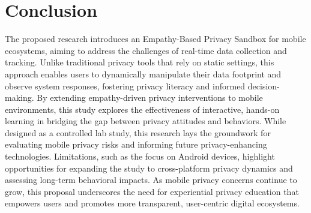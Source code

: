 \documentclass[acmlarge, nonacm]{acmart}
\begin{document}





\section{Conclusion}

The proposed research introduces an Empathy-Based Privacy Sandbox for mobile ecosystems, aiming to address the challenges of real-time data collection and tracking. Unlike traditional privacy tools that rely on static settings, this approach enables users to dynamically manipulate their data footprint and observe system responses, fostering privacy literacy and informed decision-making. By extending empathy-driven privacy interventions to mobile environments, this study explores the effectiveness of interactive, hands-on learning in bridging the gap between privacy attitudes and behaviors. While designed as a controlled lab study, this research lays the groundwork for evaluating mobile privacy risks and informing future privacy-enhancing technologies. Limitations, such as the focus on Android devices, highlight opportunities for expanding the study to cross-platform privacy dynamics and assessing long-term behavioral impacts. As mobile privacy concerns continue to grow, this proposal underscores the need for experiential privacy education that empowers users and promotes more transparent, user-centric digital ecosystems.
\end{document}
